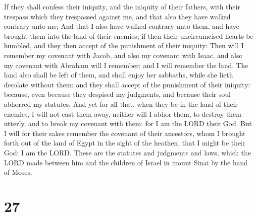  If they shall confess their iniquity, and the iniquity
of their fathers, with their trespass which they trespassed against me,
and that also they have walked contrary unto me;  And
that I also have walked contrary unto them, and have brought them into
the land of their enemies; if then their uncircumcised hearts be
humbled, and they then accept of the punishment of their iniquity:
 Then will I remember my covenant with Jacob, and also my
covenant with Isaac, and also my covenant with Abraham will I remember;
and I will remember the land.  The land also shall be
left of them, and shall enjoy her sabbaths, while she lieth desolate
without them: and they shall accept of the punishment of their iniquity:
because, even because they despised my judgments, and because their soul
abhorred my statutes.  And yet for all that, when they be
in the land of their enemies, I will not cast them away, neither will I
abhor them, to destroy them utterly, and to break my covenant with them:
for I am the LORD their God.  But I will for their sakes
remember the covenant of their ancestors, whom I brought forth out of
the land of Egypt in the sight of the heathen, that I might be their
God: I am the LORD.  These are the statutes and judgments
and laws, which the LORD made between him and the children of Israel in
mount Sinai by the hand of Moses.

\hypertarget{section-26}{%
\section{27}\label{section-26}}

